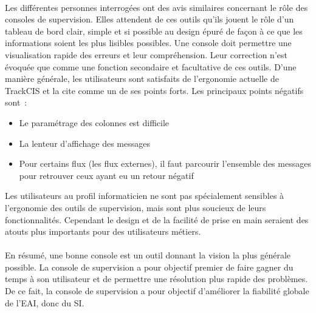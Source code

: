 			\paragraph{}%
			Les différentes personnes interrogées ont des avis similaires concernant le
			rôle des consoles de supervision. Elles attendent
			de ces outils qu’ils jouent le rôle d'un tableau de bord clair, simple et si
			possible au design épuré de façon à ce que les informations soient les plus
			lisibles possibles. Une console doit permettre une visualisation rapide des
			erreurs et leur compréhension. Leur correction n’est évoquée que comme une
			fonction secondaire et facultative de ces outils.\newline
			D’une manière générale, les utilisateurs sont satisfaits de l’ergonomie
			actuelle de TrackCIS et la cite comme un de ses points forts.
			Les principaux points négatifs sont~:
			\begin{itemize}
			  \item Le paramétrage des colonnes est difficile
			  \item La lenteur d’affichage des messages
			  \item Pour certains flux  (les flux externes), il faut parcourir l'ensemble
			  des messages pour retrouver ceux ayant eu un retour négatif
			\end{itemize}
			Les utilisateurs au profil informaticien ne sont pas spécialement sensibles
			à l’ergonomie des outils de supervision, mais sont plus soucieux de leurs
			fonctionnalités. Cependant le design et de la facilité de prise en main
			seraient des atouts plus importants pour des utilisateurs métiers.
			
			\paragraph{}%
			En résumé, une bonne console est un outil donnant la vision la plus générale
			possible. La console de supervision a pour objectif premier de faire gagner
			du temps à son utilisateur et de permettre une résolution plus rapide des
			problèmes. De ce fait, la console de supervision a pour objectif d’améliorer
			la fiabilité globale de l’EAI, donc du SI.
			
